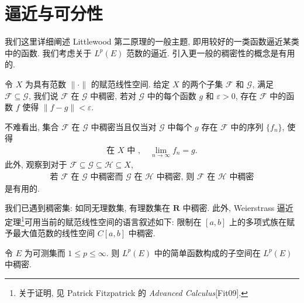 \documentclass[../../main.tex]{subfiles}
\begin{document}
\section{逼近与可分性}\label{section:ch07-逼近与可分性}

我们这里详细阐述 Littlewood 第二原理的一般主题, 即用较好的一类函数逼近某类中的函数. 我们考虑关于 $L^{p}(E)$ 范数的逼近. 引入更一般的稠密性的概念是有用的.

\begin{definition}[稠密]\label{definition:ch07-稠密}
令 $X$ 为具有范数 $\|\cdot\|$ 的赋范线性空间. 给定 $X$ 的两个子集 $\mathcal{F}$ 和 $\mathcal{G}$, 满足 $\mathcal{F}\subseteq\mathcal{G}$, 我们说 $\mathcal{F}$ 在 $\mathcal{G}$ 中稠密, 若对 $\mathcal{G}$ 中的每个函数 $g$ 和 $\varepsilon>0$, 存在 $\mathcal{F}$ 中的函数 $f$ 使得 $\|f-g\|<\varepsilon$.
\end{definition}

不难看出, 集合 $\mathcal{F}$ 在 $\mathcal{G}$ 中稠密当且仅当对 $\mathcal{G}$ 中每个 $g$ 存在 $\mathcal{F}$ 中的序列 $\{f_{n}\}$, 使得
\begin{align*}
\text{在 }X\text{ 中 },\quad\lim_{n\to\infty}f_{n}=g.
\end{align*}
此外, 观察到对于 $\mathcal{F}\subseteq\mathcal{G}\subseteq\mathcal{H}\subseteq X$,
\begin{align}
\text{若 }\mathcal{F}\text{ 在 }\mathcal{G}\text{ 中稠密而 }\mathcal{G}\text{ 在 }\mathcal{H}\text{ 中稠密, 则 }\mathcal{F}\text{ 在 }\mathcal{H}\text{ 中稠密}\label{align:ch07-稠密传递}
\end{align}
是有用的.

我们已遇到稠密集: 如同无理数集, 有理数集在 $\mathbf{R}$ 中稠密. 此外, Weierstrass 逼近定理\footnote{关于证明, 见 Patrick Fitzpatrick 的 \emph{Advanced Calculus}[Fit09].}可用当前的赋范线性空间的语言叙述如下: 限制在 $[a,b]$ 上的多项式族在赋予最大值范数的线性空间 $C[a,b]$ 中稠密.

\begin{proposition}\label{proposition:ch07-简单函数稠密}
令 $E$ 为可测集而 $1\leqslant p\leqslant\infty$. 则 $L^{p}(E)$ 中的简单函数构成的子空间在 $L^{p}(E)$ 中稠密.
\end{proposition}
\end{document}
